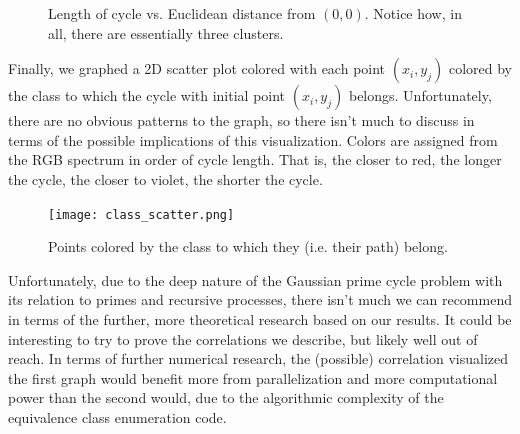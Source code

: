 \documentclass{article}
\begin{document}
\begin{figure}[H]

\caption{Length of cycle vs. Euclidean distance from $(0,0)$. Notice how, in all, there are essentially three clusters.}
\end{figure}

Finally, we graphed a 2D scatter plot colored with each point $(x_i, y_j)$ colored by the class to which the cycle with initial point $(x_i, y_j)$ belongs. Unfortunately, there are no obvious patterns to the graph, so there isn't much to discuss in terms of the possible implications of this visualization. Colors are assigned from the RGB spectrum in order of cycle length. That is, the closer to red, the longer the cycle, the closer to violet, the shorter the cycle.

\begin{figure}[H]
\center
\texttt{[image: class\_scatter.png]}
\caption{Points colored by the class to which they (i.e. their path) belong.}
\end{figure}

Unfortunately, due to the deep nature of the Gaussian prime cycle problem with its relation to primes and recursive processes, there isn't much we can recommend in terms of the further, more theoretical research based on our results. It could be interesting to try to prove the correlations we describe, but likely well out of reach. In terms of further numerical research, the (possible) correlation visualized the first graph would benefit more from parallelization and more computational power than the second would, due to the algorithmic complexity of the equivalence class enumeration code.



\end{document}

